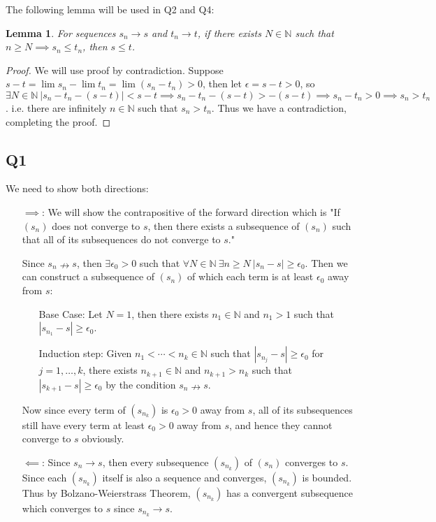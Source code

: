 \documentclass[12pt,lettersize]{article}
\newcommand{\N}{\mathbb{N}}
\newtheorem{lem*}{Lemma}
\theoremstyle{remark}
\begin{document}
	The following lemma will be used in Q2 and Q4:
	\begin{lem*}
	For sequences $s_n\rightarrow s$ and $t_n\rightarrow t$, if there exists $N\in\N$ such that $n\geq N\implies s_n\leq t_n$, then $s\leq t$.
	\end{lem*}
	\begin{proof}
	We will use proof by contradiction. Suppose $s-t=\lim s_n-\lim t_n=\lim(s_n-t_n)>0$, then let $\epsilon=s-t>0$, so $\exists N\in\N\ |s_n-t_n-(s-t)|<s-t\implies s_n-t_n-(s-t)>-(s-t)\implies s_n-t_n>0\implies s_n>t_n$. i.e. there are infinitely $n\in\N$ such that $s_n>t_n$. Thus we have a contradiction, completing the proof.
	\end{proof}
	
	\newpage
	
	\subsection*{Q1}
	We need to show both directions:
	\begin{itemize}
		\item[$\implies$:] We will show the contrapositive of the forward direction which is "If $(s_n)$ does not converge to $s$, then there exists a subsequence of $(s_n)$ such that all of its subsequences do not converge to $s$." 
		
		Since $s_n\nrightarrow s$, then $\exists\epsilon_0>0$ such that $\forall N\in\N\ \exists n\geq N\ |s_n-s|\geq\epsilon_0$. Then we can construct a subsequence of $(s_n)$ of which each term is at least $\epsilon_0$ away from $s$:
		\begin{itemize}
			\item[Base Case:] Let $N=1$, then there exists $n_1\in\N$ and $n_1>1$ such that $|s_{n_1}-s|\geq\epsilon_0$.
			\item[Induction step:] Given $n_1<\cdots<n_k\in\N$ such that $|s_{n_j}-s|\geq\epsilon_0$ for $j=1,\dots,k$, there exists $n_{k+1}\in\N$ and  $n_{k+1}>n_k$ such that $|s_{k+1}-s|\geq\epsilon_0$ by the condition $s_n\nrightarrow s$.
		\end{itemize}
		Now since every term of $(s_{n_k})$ is $\epsilon_0>0$ away from $s$, all of its subsequences still have every term at least $\epsilon_0>0$ away from $s$, and hence they cannot converge to $s$ obviously.
		\item[$\impliedby$:] Since $s_n\rightarrow s$, then every subsequence $(s_{n_k})$ of $(s_n)$ converges to $s$. Since each $(s_{n_k})$ itself is also a sequence and converges, $(s_{n_k})$ is bounded. Thus by Bolzano-Weierstrass Theorem, $(s_{n_k})$ has a convergent subsequence which converges to $s$ since $s_{n_k}\rightarrow s$.
	\end{itemize}
	\newpage
	
\end{document}
